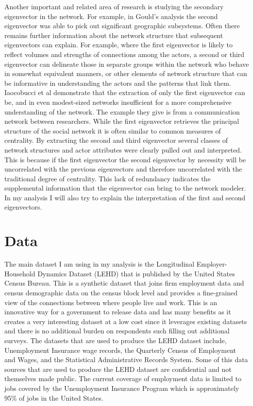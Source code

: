\documentclass{article}
\begin{document}
Another important and related area of research is studying the secondary eigenvector in the network.  For example, in Gould’s analysis the second eigenvector was able to pick out significant geographic subsystems.  Often there remains further information about the network structure that subsequent eigenvectors can explain. For example, where the first eigenvector is likely to reflect volumes and strengths of connections among the actors, a second or third eigenvector can delineate those in separate groups within the network who behave in somewhat equivalent manners, or other elements of network structure that can be informative in understanding the actors and the patterns that link them. Iaocobucci et al demonstrate that the extraction of only the first eigenvector can be, and in even modest-sized networks insufficient for a more comprehensive understanding of the network.  The example they give is from a communication network between researchers.  While the first eigenvector retrieves the principal structure of the social network it is often similar to common measures of centrality.  By extracting the second and third eigenvector several classes of network structures and actor attributes were clearly pulled out and interpreted.  This is because if the first eigenvector the second eigenvector by necessity will be uncorrelated with the previous eigenvectors and therefore uncorrelated with the traditional degree of centrality.  This lack of redundancy indicates the supplemental information that the eigenvector can bring to the network modeler.  In my analysis I will also try to explain the interpretation of the first and second eigenvectors.

\section{Data}
The main dataset I am using in my analysis is the Longitudinal Employer-Household Dynamics Dataset (LEHD) that is published by the United States Census Bureau.  This is a synthetic dataset that joins firm employment data and census demographic data on the census block level and provides a fine-grained view of the connections between where people live and work.  This is an innovative way for a government to release data and has many benefits as it creates a very interesting dataset at a low cost since it leverages existing datasets and there is no additional burden on respondents such filling out additional surveys.  The datasets that are used to produce the LEHD dataset include, Unemployment Insurance wage records, the Quarterly Census of Employment and Wages, and the Statistical Administrative Records System.  Some of this data sources that are used to produce the LEHD dataset are confidential and not themselves made public.  The current coverage of employment data is limited to jobs covered by the Unemployment Insurance Program which is approximately 95\% of jobs in the United States.  \\
\end{document}
